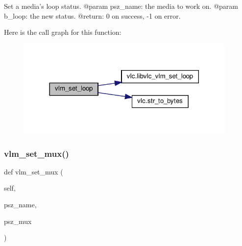 \begin{DoxyVerb}Set a media's loop status.
@param psz_name: the media to work on.
@param b_loop: the new status.
@return: 0 on success, -1 on error.
\end{DoxyVerb}
 Here is the call graph for this function\+:
\nopagebreak
\begin{figure}[H]
\begin{center}
\leavevmode
\includegraphics[width=308pt]{classvlc_1_1_instance_a8091fb7adc87dd1f5658e7cf0e1ed8b3_cgraph}
\end{center}
\end{figure}
\mbox{\label{classvlc_1_1_instance_ae9782ac282ce7c000257f7f38393729f}} 
\subsubsection{\texorpdfstring{vlm\+\_\+set\+\_\+mux()}{vlm\_set\_mux()}}
{\footnotesize\ttfamily def vlm\+\_\+set\+\_\+mux (\begin{DoxyParamCaption}\item[{}]{self,  }\item[{}]{psz\+\_\+name,  }\item[{}]{psz\+\_\+mux }\end{DoxyParamCaption})}


